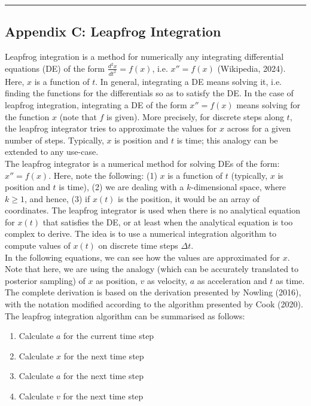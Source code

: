 \documentclass[conference]{IEEEtran}
\begin{document}
\par\noindent\rule{0.49\textwidth}{0.1pt}

\subsection*{Appendix C: Leapfrog Integration}
Leapfrog integration is a method for numerically any integrating differential equations (DE) of the form $\frac{d^2x}{dt^2} = f(x)$, i.e. $x'' = f(x)$ (Wikipedia, 2024). Here, $x$ is a function of $t$. In general, integrating a DE means solving it, i.e. finding the functions for the differentials so as to satisfy the DE. In the case of leapfrog integration, integrating a DE of the form $x'' = f(x)$ means solving for the function $x$ (note that $f$ is given). More precisely, for discrete steps along $t$, the leapfrog integrator tries to approximate the values for $x$ across for a given number of steps. Typically, $x$ is position and $t$ is time; this analogy can be extended to any use-case.\\

The leapfrog integrator is a numerical method for solving DEs of the form: $x'' = f(x)$. Here, note the following: (1) $x$ is a function of $t$ (typically, $x$ is position and $t$ is time), (2) we are dealing with a $k$-dimensional space, where $k \geq 1$, and hence, (3) if $x(t)$ is the position, it would be an array of coordinates. The leapfrog integrator is used when there is no analytical equation for $x(t)$ that satisfies the DE, or at least when the analytical equation is too complex to derive. The idea is to use a numerical integration algorithm to compute values of $x(t)$ on discrete time steps $\Delta t$.\\

In the following equations, we can see how the values are approximated for $x$. Note that here, we are using the analogy (which can be accurately translated to posterior sampling) of $x$ as position, $v$ as velocity, $a$ as acceleration and $t$ as time. The complete derivation is based on the derivation presented by Nowling (2016), with the notation modified according to the algorithm presented by Cook (2020). The leapfrog integration algorithm can be summarised as follows:\\

\begin{enumerate}
	\item Calculate $a$ for the current time step
	\item Calculate $x$ for the next time step
	\item Calculate $a$ for the next time step
	\item Calculate $v$ for the next time step\\
\end{enumerate}
\end{document}
